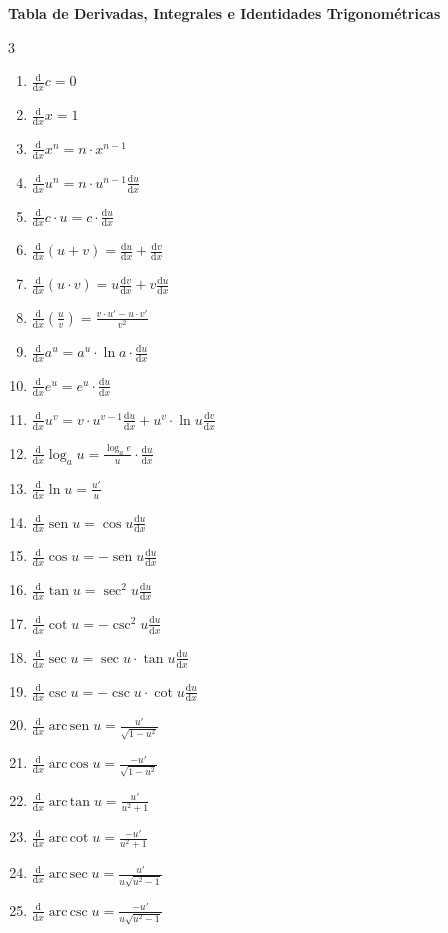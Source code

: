 \documentclass[9pt,landscape,a4paper]{article}
\newcommand{\deriv}[2]{\frac{\mathrm{d} #1}{\mathrm{d} #2}}
\DeclareMathOperator{\sen}{sen}
\DeclareMathOperator{\arcsen}{arc\,sen}
\renewcommand{\arccos}{\operatorname{arc\,cos}}
\renewcommand{\arctan}{\operatorname{arc\,tan}}
\DeclareMathOperator{\arccot}{arc\,cot}
\DeclareMathOperator{\arcsec}{arc\,sec}
\DeclareMathOperator{\arccsc}{arc\,csc}
\begin{document}
\begin{center}
{\Large \textbf{\textcolor{primary}{Tabla de Derivadas, Integrales e Identidades Trigonométricas}}}
\vspace{0.2cm}
\end{center}

\begin{multicols}{3}

\begin{tcolorbox}[colback=primary!3,colframe=primary,fonttitle=\bfseries,title=Tabla de Derivadas]
\begin{enumerate}
\item $\deriv{}{x} c = 0$
\item $\deriv{}{x} x = 1$
\item $\deriv{}{x} x^n = n \cdot x^{n-1}$
\item $\deriv{}{x} u^n = n \cdot u^{n-1} \deriv{u}{x}$
\item $\deriv{}{x} c \cdot u = c \cdot \deriv{u}{x}$
\item $\deriv{}{x} (u+v) = \deriv{u}{x} + \deriv{v}{x}$
\item $\deriv{}{x} (u \cdot v) = u \deriv{v}{x} + v \deriv{u}{x}$
\item $\deriv{}{x} \left(\frac{u}{v}\right) = \frac{v \cdot u' - u \cdot v'}{v^2}$
\item $\deriv{}{x} a^u = a^u \cdot \ln a \cdot \deriv{u}{x}$
\item $\deriv{}{x} e^u = e^u \cdot \deriv{u}{x}$
\item $\deriv{}{x} u^v = v \cdot u^{v-1} \deriv{u}{x} + u^v \cdot \ln u \deriv{v}{x}$
\item $\deriv{}{x} \log_a u = \frac{\log_a e}{u} \cdot \deriv{u}{x}$
\item $\deriv{}{x} \ln u = \frac{u'}{u}$
\item $\deriv{}{x} \sen u = \cos u \deriv{u}{x}$
\item $\deriv{}{x} \cos u = -\sen u \deriv{u}{x}$
\item $\deriv{}{x} \tan u = \sec^2 u \deriv{u}{x}$
\item $\deriv{}{x} \cot u = -\csc^2 u \deriv{u}{x}$
\item $\deriv{}{x} \sec u = \sec u \cdot \tan u \deriv{u}{x}$
\item $\deriv{}{x} \csc u = -\csc u \cdot \cot u \deriv{u}{x}$
\item $\deriv{}{x} \arcsen u = \frac{u'}{\sqrt{1-u^2}}$
\item $\deriv{}{x} \arccos u = \frac{-u'}{\sqrt{1-u^2}}$
\item $\deriv{}{x} \arctan u = \frac{u'}{u^2+1}$
\item $\deriv{}{x} \arccot u = \frac{-u'}{u^2+1}$
\item $\deriv{}{x} \arcsec u = \frac{u'}{u\sqrt{u^2-1}}$
\item $\deriv{}{x} \arccsc u = \frac{-u'}{u\sqrt{u^2-1}}$
\end{enumerate}
\end{tcolorbox}


\end{multicols}
\end{document}

